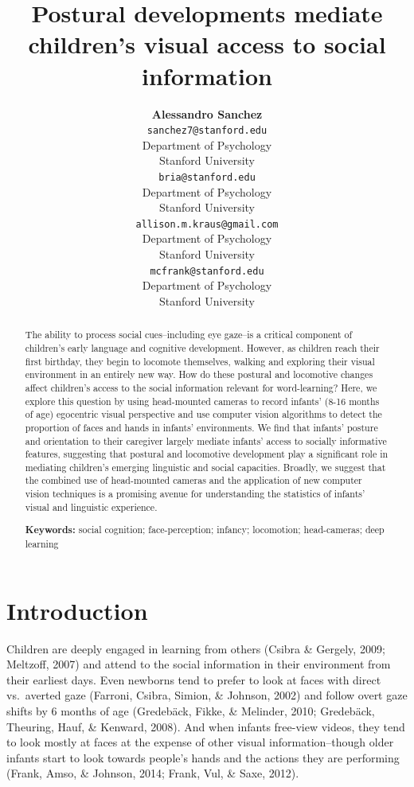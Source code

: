 \documentclass[10pt, letterpaper]{article}
\title{Postural developments mediate children's visual access to social
information}
\author{{\large \bf Alessandro Sanchez} \\ \texttt{sanchez7@stanford.edu} \\ Department of Psychology \\ Stanford University \And {\large \bf Bria Long} \\ \texttt{bria@stanford.edu} \\ Department of Psychology \\ Stanford University \And {\large \bf Ally Kraus} \\ \texttt{allison.m.kraus@gmail.com} \\ Department of Psychology \\ Stanford University \And {\large \bf Michael C. Frank} \\ \texttt{mcfrank@stanford.edu} \\ Department of Psychology \\ Stanford University}
\begin{document}
\maketitle

\begin{abstract}
The ability to process social cues--including eye gaze--is a critical
component of children's early language and cognitive development.
However, as children reach their first birthday, they begin to locomote
themselves, walking and exploring their visual environment in an
entirely new way. How do these postural and locomotive changes affect
children's access to the social information relevant for word-learning?
Here, we explore this question by using head-mounted cameras to record
infants' (8-16 months of age) egocentric visual perspective and use
computer vision algorithms to detect the proportion of faces and hands
in infants' environments. We find that infants' posture and orientation
to their caregiver largely mediate infants' access to socially
informative features, suggesting that postural and locomotive
development play a significant role in mediating children's emerging
linguistic and social capacities. Broadly, we suggest that the combined
use of head-mounted cameras and the application of new computer vision
techniques is a promising avenue for understanding the statistics of
infants' visual and linguistic experience.

\textbf{Keywords:}
social cognition; face-perception; infancy; locomotion; head-cameras;
deep learning
\end{abstract}

\section{Introduction}\label{introduction}

Children are deeply engaged in learning from others (Csibra \& Gergely,
2009; Meltzoff, 2007) and attend to the social information in their
environment from their earliest days. Even newborns tend to prefer to
look at faces with direct vs.~averted gaze (Farroni, Csibra, Simion, \&
Johnson, 2002) and follow overt gaze shifts by 6 months of age
(Gredebäck, Fikke, \& Melinder, 2010; Gredebäck, Theuring, Hauf, \&
Kenward, 2008). And when infants free-view videos, they tend to look
mostly at faces at the expense of other visual information--though older
infants start to look towards people's hands and the actions they are
performing (Frank, Amso, \& Johnson, 2014; Frank, Vul, \& Saxe, 2012).
\end{document}
